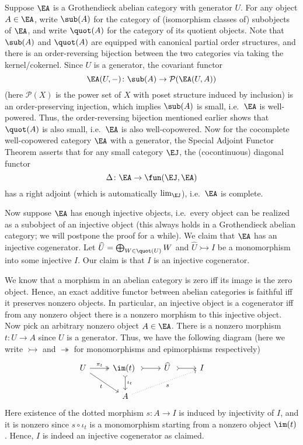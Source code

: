 \documentclass[twoside]{article}
\begin{document}
Suppose $\EA$ is a Grothendieck abelian category with generator $U$. For any object $A \in \EA$, write $\sub(A)$ for the category of (isomorphism classes of) subobjects of $\EA$, and write $\quot(A)$ for the category of its quotient objects.
Note that $\sub(A)$ and $\quot(A)$ are equipped with canonical partial order structures, and there is an order-reversing bijection between the two categories via taking the kernel/cokernel. Since $U$ is a generator, the covariant functor $$\EA(U, -)\colon \sub(A) \rightarrow \mathcal{P}(\EA(U,A))$$
(here $\mathcal{P}(X)$ is the power set of $X$ with poset structure induced by inclusion) is an order-preserving injection, which implies $\sub(A)$ is small, i.e.\ $\EA$ is well-powered. Thus, the order-reversing bijection mentioned earlier shows that $\quot(A)$ is also small, i.e.\ $\EA$ is also well-copowered. Now for the cocomplete well-copowered category $\EA$ with a generator, the Special Adjoint Functor Theorem \cite[Theorem~4.6.10]{Rie17} asserts that for any small category $\EJ$, the (cocontinuous) diagonal functor $$\Delta\colon \EA \rightarrow \fun(\EJ, \EA)$$ has a right adjoint (which is automatically $\lim_\EJ$), i.e.\ $\EA$ is complete.\vspace{\topsep}

Now suppose $\EA$ has enough injective objects, i.e.\ every object can be realized as a subobject of an injective object (this always holds in a Grothendieck abelian category; we will postpone the proof for a while). We claim that $\EA$ has an injective cogenerator. Let $\widehat{U} = \bigoplus_{W \in \quot(U)} W$ and $\widehat{U} \rightarrowtail I$ be a monomorphism into some injective $I$. Our claim is that $I$ is an injective cogenerator.\vspace{\topsep}

We know that a morphism in an abelian category is zero iff its image is the zero object. Hence, an exact additive functor between abelian categories is faithful iff it preserves nonzero objects. In particular, an injective object is a cogenerator iff from any nonzero object there is a nonzero morphism to this injective object. Now pick an arbitrary nonzero object $A \in \EA$. There is a nonzero morphism $t\colon U \rightarrow A$ since $U$ is a generator. Thus, we have the following diagram (here we write $\rightarrowtail$ and $\twoheadrightarrow$ for monomorphisms and epimorphisms respectively)
$$\begin{tikzcd}
    U\ar[rd, "t"'] \ar[r, two heads, "\pi_t"] & \im(t) \  \ar[d, tail, "\iota_t"] \ar[r, tail]  & \widehat{U} \  \ar[r, tail] & I \\
& A \ar[rru, dotted, "s"']&&&
\end{tikzcd}$$
Here existence of the dotted morphism $s\colon A \rightarrow I$ is induced by injectivity of $I$, and it is nonzero since $s \circ \iota_t$ is a monomorphism starting from a nonzero object $\im(t)$. Hence, $I$ is indeed an injective cogenerator as claimed.\vspace{\topsep}
\end{document}

